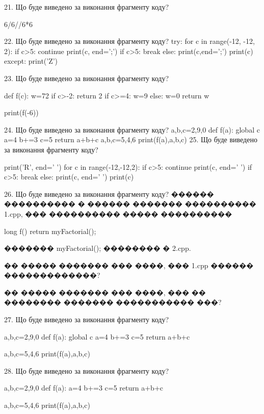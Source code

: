 \documentclass[11pt]{article}
\begin{document}
21. Що буде виведено за виконання фрагменту коду?

6/6//6*6

22. Що буде виведено за виконання фрагменту коду?
try:
    for c in range(-12, -12, 2):
        if c>5:
            continue
        print(c, end=';')
        if c>5:
            break
    else:
        print(c,end=';')
    print(c)
except:
    print('Z')

23. Що буде виведено за виконання фрагменту коду?

def f(c):
    w=72
    if c>-2: 
        return 2
    if c>=4:
         w=9
    else:
         w=0
    return w

print(f(-6))

24. Що буде виведено за виконання фрагменту коду?
a,b,c=2,9,0
   def f(a):
     global c     a=4
     b+=3
     c=5
     return a+b+c
   a,b,c=5,4,6
   print(f(a),a,b,c)
25. Що буде виведено за виконання фрагменту коду?

print('R', end=' ')
for c in range(-12,-12,2):
    if c>5:
        continue
        print(c, end=' ')
    if c>5:
        break
    else:
        print(c, end=' ')
    print(c)

26. Що буде виведено за виконання фрагменту коду?
������ ���������� � ������ ������� ���������� 1.cpp, ��� ���������� ����� ����������\par
long f(){ return myFactorial();}\par
������� myFactorial(); �������� � 2.cpp.\par
�� ����� ������� ��� ����, ��� 1.cpp ������ �������������?\par\vspace{1.5cm}
�� ����� ������� ��� ����, ��� �� �������� ������� ����������� ���?\par

27. Що буде виведено за виконання фрагменту коду?

a,b,c=2,9,0
def f(a):
global c    a=4
    b+=3
    c=5
    return a+b+c

a,b,c=5,4,6
print(f(a),a,b,c)

28. Що буде виведено за виконання фрагменту коду?

a,b,c=2,9,0
def f(a):
    a=4
    b+=3
    c=5
    return a+b+c

a,b,c=5,4,6
print(f(a),a,b,c)
\end{document}
